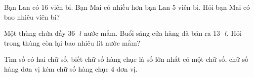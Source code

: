 \begin{bt}[1,5 điểm]
Bạn Lan có $16$ viên bi. Bạn Mai có nhiều hơn bạn Lan $5$ viên bi. Hỏi bạn Mai có bao nhiêu viên bi?
\end{bt}

\begin{bt}[1,0 điểm]
Một thùng chứa đầy $36\text{ }l$ nước mắm. Buổi sáng cửa hàng đã bán ra $13\text{ }l$. Hỏi trong thùng còn lại bao nhiêu lít nước mắm?
\end{bt}

\begin{bt}[1,0 điểm]
Tìm số có hai chữ số, biết chữ số hàng chục là số lớn nhất có một chữ số, chữ số hàng đơn vị kém chữ số hàng chục $4$ đơn vị.
\end{bt}
